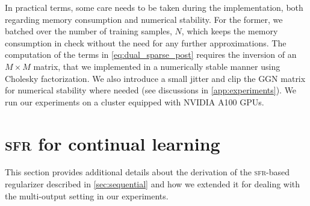 \documentclass{article} %
\newcommand{\our}{\textsc{sfr}\xspace}
\begin{document}
In practical terms, some care needs to be taken during the implementation, both regarding memory consumption and numerical stability. For the former, we batched over the number of training samples, $N$, which keeps the memory consumption in check without the need for any further approximations. The computation of the terms in \cref{eq:dual_sparse_post} requires the inversion of an $M \times M$ matrix, that we implemented in a numerically stable manner using Cholesky factorization. We also introduce a small jitter and clip the GGN matrix for numerical stability where needed (see discussions in \cref{app:experiments}).
 We run our experiments on a cluster equipped with NVIDIA A100 GPUs.

\section{\our for continual learning}
\label{app:cl}
This section provides additional details about the derivation of the \our-based regularizer described in \cref{sec:sequential} and how we extended it for dealing with the multi-output setting in our experiments.
\end{document}

